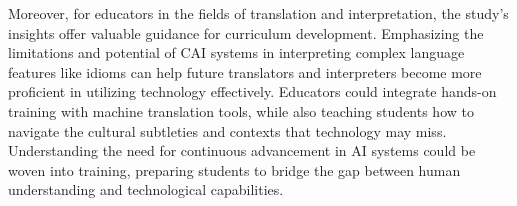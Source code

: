 Moreover, for educators in the fields of translation and interpretation,
the study's insights offer valuable guidance for
curriculum development. Emphasizing the limitations and potential of CAI
systems in interpreting complex language features like idioms can help
future translators and interpreters become more proficient in utilizing
technology effectively. Educators could integrate hands-on training with
machine translation tools, while also teaching students how to navigate
the cultural subtleties and contexts that technology may miss.
Understanding the need for continuous advancement in AI systems could be
woven into training, preparing students to bridge the gap between human
understanding and technological capabilities.
